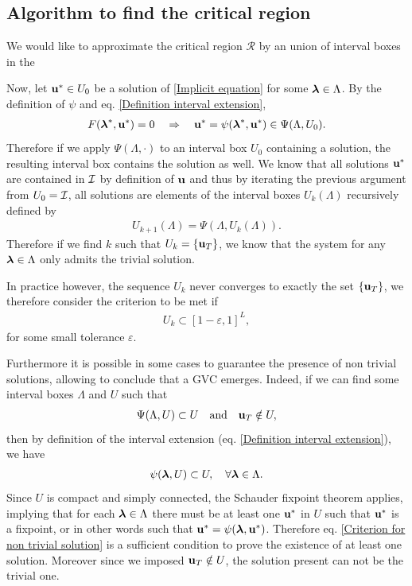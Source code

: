 \documentclass[
11pt, %
english, %
singlespacing, %
nolistspacing, %
liststotoc, %
headsepline, %
]{MastersDoctoralThesis} %
\begin{document}
\subsection{Algorithm to find the critical region}

We would like to approximate the critical region $\mathcal{R}$ by an union of interval boxes in the 


Now, let $\boldsymbol{\mathrm{u}}^* \in U_0$ be a solution of \eqref{Implicit equation} for some $\boldsymbol{\mathrm{\lambda}} \in \Lambda$. By the definition of $\psi$ and eq. \eqref{Definition interval extension},
\begin{align}
	F(\boldsymbol{\mathrm{\lambda}}^*, \boldsymbol{\mathrm{u}}^*) = 0 \quad \Rightarrow \quad \boldsymbol{\mathrm{u}}^* = \psi(\boldsymbol{\mathrm{\lambda}}^*, \boldsymbol{\mathrm{u}}^*) \in \Psi(\Lambda, U_0).
\end{align}
Therefore if we apply $\Psi(\Lambda, \cdot)$ to an interval box $U_0$ containing a solution, the resulting interval box contains the solution as well. We know that all solutions $\boldsymbol{\mathrm{u}}^*$ are contained in $\mathcal{I}$ by definition of $\boldsymbol{\mathrm{u}}$ and thus by iterating the previous argument from $U_0 = \mathcal{I}$, all solutions are elements of the interval boxes $U_k(\Lambda)$ recursively defined by
\begin{align}
	U_{k+1}(\Lambda) = \Psi(\Lambda, U_k(\Lambda)). \label{Recursion relation for Uk}
\end{align}
Therefore if we find $k$ such that $U_k = \{\boldsymbol{\mathrm{u}}_T\}$, we know that the system for any $\boldsymbol{\mathrm{\lambda}} \in \Lambda$ only admits the trivial solution.

In practice however, the sequence $U_k$ never converges to exactly the set $\{\boldsymbol{\mathrm{u}}_T\}$, we therefore consider the criterion to be met if
\begin{align}
	U_k \subset [1 - \varepsilon, 1]^L, \label{Criterion for trivial region}
\end{align}
for some small tolerance $\varepsilon$.

Furthermore it is possible in some cases to guarantee the presence of non trivial solutions, allowing to conclude that a GVC emerges. Indeed, if we can find some interval boxes $\Lambda$ and $U$ such that
\begin{align}
	\Psi(\Lambda, U) \subset U \quad \text{and} \quad \boldsymbol{\mathrm{u}}_T \notin U, \label{Criterion for non trivial solution}
\end{align}
then by definition of the interval extension (eq. \eqref{Definition interval extension}), we have
\begin{align}
	\psi(\boldsymbol{\mathrm{\lambda}}, U) \subset U, \quad \forall \boldsymbol{\mathrm{\lambda}} \in \Lambda.
\end{align}
Since $U$ is compact and simply connected, the Schauder fixpoint theorem applies, implying that for each $\boldsymbol{\mathrm{\lambda}} \in \Lambda$ there must be at least one $\boldsymbol{\mathrm{u}}^*$ in $U$ such that $\boldsymbol{\mathrm{u}}^*$ is a fixpoint, or in other words such that $\boldsymbol{\mathrm{u}}^* = \psi(\boldsymbol{\mathrm{\lambda}}, \boldsymbol{\mathrm{u}}^*)$. Therefore eq. \eqref{Criterion for non trivial solution} is a sufficient condition to prove the existence of at least one solution. Moreover since we imposed $\boldsymbol{\mathrm{u}}_T \notin U$, the solution present can not be the trivial one.
\end{document}
